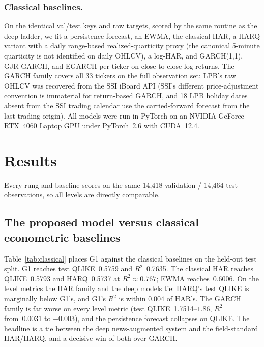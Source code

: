 \documentclass[runningheads]{llncs}
\newcommand{\GtestQ}{0.5759}     %
\newcommand{\GtestRsq}{0.7635}   %
\newcommand{\HARtestQ}{0.5793}   %
\newcommand{\HARQtestQ}{0.5737}  %
\newcommand{\EWMAtestQ}{0.6006}  %
\newcommand{\GARCHtestQ}{1.7514} %
\newcommand{\GARCHtestRsq}{0.0031}%
\newcommand{\nval}{14{,}418}
\newcommand{\ntest}{14{,}464}
\newcommand{\ntick}{33}
\begin{document}
\subsubsection{Classical baselines.}
On the identical val/test keys and raw targets, scored by the same routine as the deep ladder, we fit a
persistence forecast, an EWMA, the classical HAR, a HARQ variant with a daily range-based
realized-quarticity proxy (the canonical 5-minute quarticity is not identified on daily OHLCV), a log-HAR,
and GARCH(1,1), GJR-GARCH, and EGARCH per ticker on close-to-close log returns. The GARCH family covers all
\ntick{} tickers on the full observation set: LPB's raw OHLCV was recovered from the SSI iBoard API (SSI's
different price-adjustment convention is immaterial for return-based GARCH, and 18 LPB holiday dates absent
from the SSI trading calendar use the carried-forward forecast from the last trading origin).
All models were run in PyTorch on an NVIDIA GeForce RTX~4060 Laptop GPU under PyTorch~2.6 with CUDA~12.4.

\section{Results}
\label{sec:results}
Every rung and baseline scores on the same \nval{} validation / \ntest{} test observations, so all levels
are directly comparable.

\subsection{The proposed model versus classical econometric baselines}
\label{sec:baselines}
Table~\ref{tab:classical} places G1 against the classical baselines on the held-out test split. G1 reaches
test QLIKE~\GtestQ{} and $R^2$~\GtestRsq. The classical HAR reaches QLIKE~\HARtestQ{} and HARQ~\HARQtestQ{}
at $R^2\approx0.767$; EWMA reaches~\EWMAtestQ. On the level metrics the HAR family and the deep models tie:
HARQ's test QLIKE is marginally below G1's, and G1's $R^2$ is within $0.004$ of HAR's. The GARCH family is
far worse on every level metric (test QLIKE~\GARCHtestQ{}--$1.86$, $R^2$ from~\GARCHtestRsq{} to $-0.003$),
and the persistence forecast collapses on QLIKE. The headline is a tie between the deep news-augmented
system and the field-standard HAR/HARQ, and a decisive win of both over GARCH.
\end{document}
